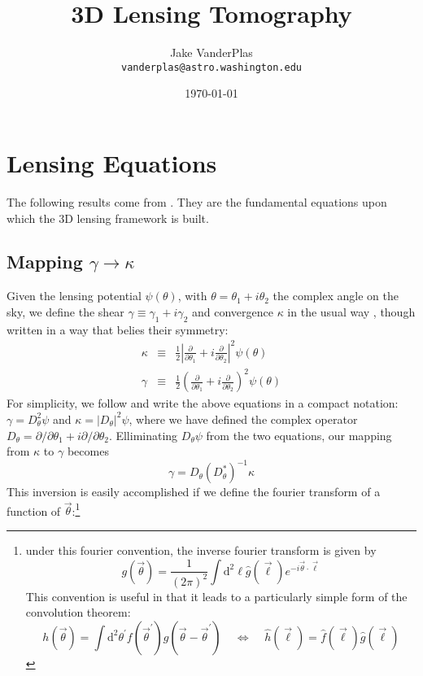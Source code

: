 \documentclass[12pt,preprint]{aastex}			%
\title{3D Lensing Tomography}	%
\author{Jake VanderPlas\\
  \texttt{vanderplas@astro.washington.edu}}
\date{\today}				%
\newcommand{\dd}{\mathrm{d}} %
\begin{document}


  
\section{Lensing Equations}
The following results come from \citep{Hu02}.  They are the fundamental
equations upon which the 3D lensing framework is built.
\subsection{Mapping $\gamma\to\kappa$}
Given the lensing potential $\psi(\theta)$, with 
$\theta = \theta_1 +i\theta_2$ the complex angle on the sky,
we define the shear $\gamma \equiv \gamma_1 + i\gamma_2$ 
and convergence $\kappa$ in the usual way \citep[eg,][eqns 55-57]{Narayan96}, 
though written in a way that belies their symmetry:
\begin{eqnarray}
  \label{kappa_def}
  \kappa &\equiv& \frac{1}{2}\left|\frac{\partial}{\partial\theta_1} +
  i\frac{\partial}{\partial\theta_2}\right|^2\psi(\theta) \\
  \label{gamma_def}
  \gamma &\equiv& \frac{1}{2}\left(\frac{\partial}{\partial\theta_1} +
  i\frac{\partial}{\partial\theta_2}\right)^2 \psi(\theta)
\end{eqnarray} 
For simplicity, we follow \citet{Kaiser93} and write the above equations
in a compact notation: $\gamma = D_\theta^2\psi$ and 
$\kappa = |D_\theta|^2\psi$, where we have defined the complex
operator $D_\theta = \partial/\partial\theta_1 + i\partial/\partial\theta_2$.  Elliminating $D_\theta\psi$ from the two equations, 
our mapping from $\kappa$ to $\gamma$ becomes
\begin{equation}
  \gamma = D_\theta (D_\theta^*)^{-1}\kappa
\end{equation}
This inversion is easily accomplished if we define 
the fourier transform of a function of 
$\vec\theta$:\footnote{
  under this fourier convention, the inverse fourier transform is given by
  \begin{displaymath}
    g(\vec\theta) = 
    \frac{1}{(2\pi)^2}\int\dd^2\ell\hat g(\vec\ell)
    e^{-i\vec\theta\cdot\vec\ell}
  \end{displaymath}
This convention is useful in that it leads to a particularly simple
form of the convolution theorem:
\begin{displaymath}
    h(\vec \theta) = \int\dd^2\theta^\prime 
    f(\vec \theta^\prime)g(\vec \theta-\vec \theta^\prime)
    \ \ \ \ \ \Longleftrightarrow\ \ \ \ \ 
    \hat h(\vec \ell) = \hat f(\vec \ell)\hat g(\vec \ell)
\end{displaymath}
}
\end{document}
